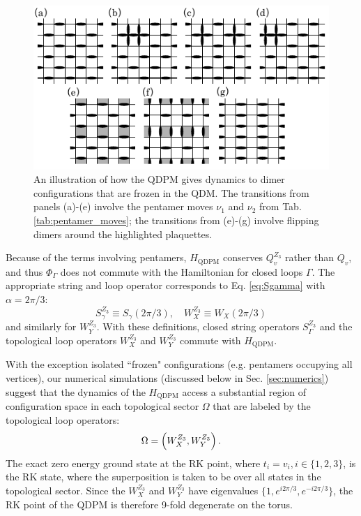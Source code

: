 \documentclass[twocolumn,prb,aps,floatfix,superscriptaddress]{revtex4-1}
\newcommand{\secref}[1]{Sec. \ref{#1}}
\newcommand{\tabref}[1]{Tab. \ref{#1}}
\newcommand{\Eqref}[1]{Eq. \eqref{#1}}
\newcommand{\HQDPM}{H_\mathrm{QDPM}}
\begin{document}
\begin{figure}[]
    \centering
    \includegraphics[width=1\linewidth]{StagToFlip.pdf}
    \caption{ An illustration of how the QDPM gives dynamics to dimer configurations that are frozen in the QDM. The transitions from panels (a)-(e) involve the pentamer moves $\nu_1$ and $\nu_2$ from \tabref{tab:pentamer_moves}; the transitions from (e)-(g) involve flipping dimers around the highlighted plaquettes. }
    \label{fig:stag_to_flip}
\end{figure}

Because of the terms involving pentamers, $\HQDPM$ conserves $Q_v^{Z_3}$ rather than $Q_v$, and thus $\Phi_\Gamma$ does not commute with the Hamiltonian for closed loops $\Gamma$. The appropriate string and loop operator corresponds to \Eqref{eq:Sgamma} with $\alpha = 2\pi/3$:
\begin{equation}
S_\gamma^{Z_3} \equiv S_\gamma \left( 2\pi/3\right), \quad W_{X}^{Z_3} \equiv W_{X} \left( 2\pi/3\right) \label{eq:SQDPM}
\end{equation}
and similarly for $W_Y^{Z_3}$. With these definitions, closed string operators $S_\Gamma^{Z_3}$ and the topological loop operators $W_{X}^{Z_3}$ and $W_{Y}^{Z_3}$ commute with $\HQDPM$.

With the exception isolated ``frozen" configurations (e.g. pentamers occupying all vertices), our numerical simulations (discussed below in \secref{sec:numerics}) suggest that the dynamics of the $\HQDPM$ access a substantial region of configuration space in each topological sector $\Omega$ that are labeled by the topological loop operators:
\begin{equation}
\Omega = \left(W_X^{Z_3},W_Y^{Z_3} \right).  \notag
\end{equation}
The exact zero energy ground state at the RK point, where $t_i=v_i, i \in \{ 1,2,3\}$, is the RK state, where the superposition is taken to be over all states in the topological sector. Since the $W_{X}^{Z_3}$ and  $W_{Y}^{Z_3}$ have eigenvalues $\{1,e^{i2\pi/3},e^{-i2\pi/3}\}$, the RK point of the QDPM is therefore 9-fold degenerate on the torus.
\end{document}
